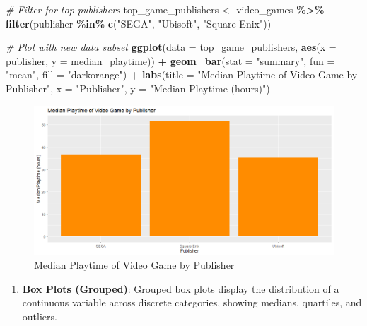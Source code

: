 \documentclass[
]{book}
\newenvironment{Shaded}{\begin{snugshade}}{\end{snugshade}}
\newcommand{\AttributeTok}[1]{\textcolor[rgb]{0.13,0.29,0.53}{#1}}
\newcommand{\CommentTok}[1]{\textcolor[rgb]{0.56,0.35,0.01}{\textit{#1}}}
\newcommand{\FunctionTok}[1]{\textcolor[rgb]{0.13,0.29,0.53}{\textbf{#1}}}
\newcommand{\NormalTok}[1]{#1}
\newcommand{\OtherTok}[1]{\textcolor[rgb]{0.56,0.35,0.01}{#1}}
\newcommand{\SpecialCharTok}[1]{\textcolor[rgb]{0.81,0.36,0.00}{\textbf{#1}}}
\newcommand{\StringTok}[1]{\textcolor[rgb]{0.31,0.60,0.02}{#1}}
\providecommand{\tightlist}{%
  \setlength{\itemsep}{0pt}\setlength{\parskip}{0pt}}
\begin{document}
\begin{Shaded}
\begin{Highlighting}[]
\CommentTok{\# Filter for top publishers}
\NormalTok{top\_game\_publishers }\OtherTok{\textless{}{-}}\NormalTok{ video\_games }\SpecialCharTok{\%\textgreater{}\%}
  \FunctionTok{filter}\NormalTok{(publisher }\SpecialCharTok{\%in\%} \FunctionTok{c}\NormalTok{(}\StringTok{"SEGA"}\NormalTok{, }\StringTok{"Ubisoft"}\NormalTok{, }\StringTok{"Square Enix"}\NormalTok{))}

\CommentTok{\# Plot with new data subset}
\FunctionTok{ggplot}\NormalTok{(}\AttributeTok{data =}\NormalTok{ top\_game\_publishers, }\FunctionTok{aes}\NormalTok{(}\AttributeTok{x =}\NormalTok{ publisher, }\AttributeTok{y =}\NormalTok{ median\_playtime)) }\SpecialCharTok{+}
  \FunctionTok{geom\_bar}\NormalTok{(}\AttributeTok{stat =} \StringTok{"summary"}\NormalTok{, }\AttributeTok{fun =} \StringTok{"mean"}\NormalTok{, }\AttributeTok{fill =} \StringTok{"darkorange"}\NormalTok{) }\SpecialCharTok{+}
  \FunctionTok{labs}\NormalTok{(}\AttributeTok{title =} \StringTok{"Median Playtime of Video Game by Publisher"}\NormalTok{, }\AttributeTok{x =} \StringTok{"Publisher"}\NormalTok{, }\AttributeTok{y =} \StringTok{"Median Playtime (hours)"}\NormalTok{)}
\end{Highlighting}
\end{Shaded}

\begin{figure}
\centering
\includegraphics[width=1\textwidth,height=\textheight]{images/barchart.png}
\caption{Median Playtime of Video Game by Publisher}
\end{figure}

\begin{enumerate}
\def\labelenumi{\arabic{enumi}.}
\setcounter{enumi}{1}
\tightlist
\item
  \textbf{Box Plots (Grouped)}: Grouped box plots display the distribution of a continuous variable across discrete categories, showing medians, quartiles, and outliers.
\end{enumerate}
\end{document}
